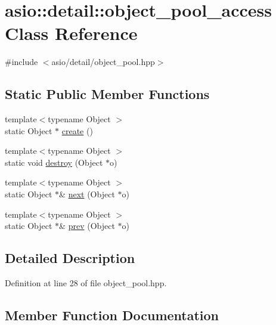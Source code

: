 \hypertarget{classasio_1_1detail_1_1object__pool__access}{}\section{asio\+:\+:detail\+:\+:object\+\_\+pool\+\_\+access Class Reference}
\label{classasio_1_1detail_1_1object__pool__access}


{\ttfamily \#include $<$asio/detail/object\+\_\+pool.\+hpp$>$}

\subsection*{Static Public Member Functions}
\begin{DoxyCompactItemize}
\item 
{\footnotesize template$<$typename Object $>$ }\\static Object $\ast$ \hyperlink{classasio_1_1detail_1_1object__pool__access_ad1d1989e1c7e0036b62da0635cadfd8d}{create} ()
\item 
{\footnotesize template$<$typename Object $>$ }\\static void \hyperlink{classasio_1_1detail_1_1object__pool__access_a0d6cec37ef7694040c02b9c8b4fcd651}{destroy} (Object $\ast$o)
\item 
{\footnotesize template$<$typename Object $>$ }\\static Object $\ast$\& \hyperlink{classasio_1_1detail_1_1object__pool__access_a5805168e236c3d846733dccc31f7144d}{next} (Object $\ast$o)
\item 
{\footnotesize template$<$typename Object $>$ }\\static Object $\ast$\& \hyperlink{classasio_1_1detail_1_1object__pool__access_af4a976ede03d63540d9dadfd4c9f9501}{prev} (Object $\ast$o)
\end{DoxyCompactItemize}


\subsection{Detailed Description}


Definition at line 28 of file object\+\_\+pool.\+hpp.



\subsection{Member Function Documentation}
\hypertarget{classasio_1_1detail_1_1object__pool__access_ad1d1989e1c7e0036b62da0635cadfd8d}{}
